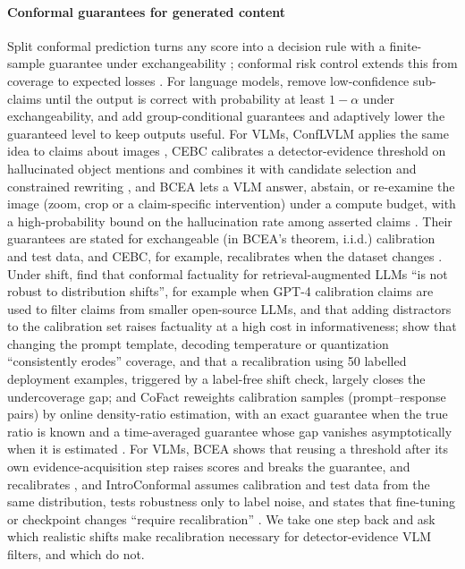 \paragraph{Conformal guarantees for generated content} Split conformal prediction turns any score into a decision rule with a finite-sample guarantee under exchangeability \citep{vovk2005algorithmic,angelopoulos2023gentle}; conformal risk control extends this from coverage to expected losses \citep{angelopoulos2022conformal}. For language models, \citet{mohri2024language} remove low-confidence sub-claims until the output is correct with probability at least $1-\alpha$ under exchangeability, and \citet{cherian2024large} add group-conditional guarantees and adaptively lower the guaranteed level to keep outputs useful. For VLMs, ConfLVLM applies the same idea to claims about images \citep{conflvlm}, CEBC calibrates a detector-evidence threshold on hallucinated object mentions and combines it with candidate selection and constrained rewriting \citep{cebc}, and BCEA lets a VLM answer, abstain, or re-examine the image (zoom, crop or a claim-specific intervention) under a compute budget, with a high-probability bound on the hallucination rate among asserted claims \citep{xu2026bcea}. Their guarantees are stated for exchangeable (in BCEA's theorem, i.i.d.) calibration and test data, and CEBC, for example, recalibrates when the dataset changes \citep[Sec.~5.2]{cebc}. Under shift, \citet{chen2026conformalrag} find that conformal factuality for retrieval-augmented LLMs ``is not robust to distribution shifts'', for example when GPT-4 calibration claims are used to filter claims from smaller open-source LLMs, and that adding distractors to the calibration set raises factuality at a high cost in informativeness; \citet{zhu2026configuration} show that changing the prompt template, decoding temperature or quantization ``consistently erodes'' coverage, and that a recalibration using 50 labelled deployment examples, triggered by a label-free shift check, largely closes the undercoverage gap; and CoFact reweights calibration samples (prompt--response pairs) by online density-ratio estimation, with an exact guarantee when the true ratio is known and a time-averaged guarantee whose gap vanishes asymptotically when it is estimated \citep{hu2026cofact}. For VLMs, BCEA shows that reusing a threshold after its own evidence-acquisition step raises scores and breaks the guarantee, and recalibrates \citep{xu2026bcea}, and IntroConformal assumes calibration and test data from the same distribution, tests robustness only to label noise, and states that fine-tuning or checkpoint changes ``require recalibration'' \citep[Limitations]{atabuzzaman2026introconformal}. We take one step back and ask which realistic shifts make recalibration necessary for detector-evidence VLM filters, and which do not.

